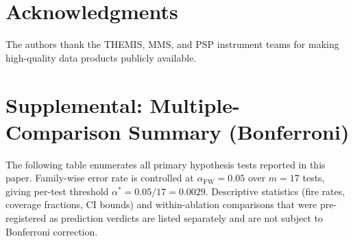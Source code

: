 \documentclass[draft]{agujournal2025}
\begin{document}
\section*{Acknowledgments}

The authors thank the THEMIS, MMS, and PSP instrument teams for making
high-quality data products publicly available.

\section*{Supplemental: Multiple-Comparison Summary (Bonferroni)}

The following table enumerates all primary hypothesis tests reported in this
paper.  Family-wise error rate is controlled at $\alpha_{\mathrm{FW}} = 0.05$
over $m=17$ tests, giving per-test threshold $\alpha^* = 0.05/17 = 0.0029$.
Descriptive statistics (fire rates, coverage fractions, CI bounds) and
within-ablation comparisons that were pre-registered as prediction verdicts
are listed separately and are not subject to Bonferroni correction.
\end{document}
